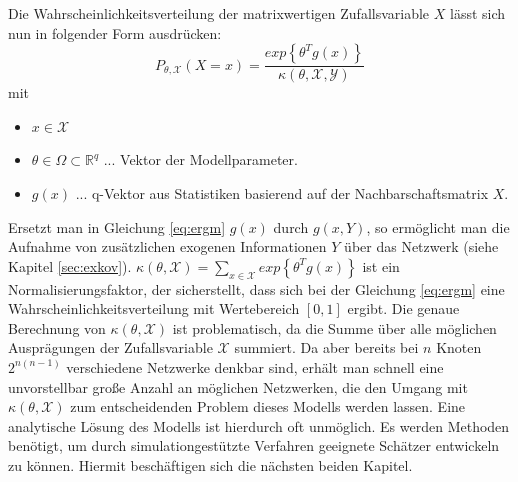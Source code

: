 \documentclass[a4paper,ngerman,oneside,titlepage,bibliography=totoc,11pt]{scrreprt}
\begin{document}
Die Wahrscheinlichkeitsverteilung der matrixwertigen Zufallsvariable $X$ lässt sich nun in folgender Form ausdrücken:
\begin{equation}
P_{\theta, \mathcal{X}}(X = x) = \frac{exp\left\{\theta^T g(x)\right\}}{\kappa(\theta, \mathcal{X, Y})}
\label{eq:ergm}
\end{equation}
mit

\begin{itemize}
	\item $x \in \mathcal{X}$
	\item $\theta \in \Omega \subset \mathbb{R}^q$ ... Vektor der Modellparameter.
	\item $g(x)$ ... q-Vektor aus Statistiken basierend auf der Nachbarschaftsmatrix $X$.
\end{itemize}
Ersetzt man in Gleichung \ref{eq:ergm} $g(x)$ durch $g(x,Y)$, so ermöglicht man die Aufnahme von zusätzlichen exogenen Informationen $Y$ über das Netzwerk (siehe Kapitel \ref{sec:exkov}). $\kappa(\theta, \mathcal{X}) = \sum_{x \in \mathcal{X}}{exp\left\{\theta^T g(x)\right\}}$ ist ein Normalisierungsfaktor, der sicherstellt, dass sich bei der Gleichung \ref{eq:ergm} eine Wahrscheinlichkeitsverteilung mit Wertebereich $[0,1]$ ergibt. Die genaue Berechnung von $\kappa(\theta, \mathcal{X})$ ist problematisch, da die Summe über alle möglichen Ausprägungen der Zufallsvariable $\mathcal{X}$ summiert. Da aber bereits bei $n$ Knoten $2^{n(n-1)}$ verschiedene Netzwerke denkbar sind, erhält man schnell eine unvorstellbar große Anzahl an möglichen Netzwerken, die den Umgang mit  $\kappa(\theta, \mathcal{X})$ zum entscheidenden Problem dieses Modells werden lassen. Eine analytische Lösung des Modells ist hierdurch oft unmöglich. Es werden Methoden benötigt, um durch simulationgestützte Verfahren geeignete Schätzer entwickeln zu können. Hiermit beschäftigen sich die nächsten beiden Kapitel.
\end{document}
